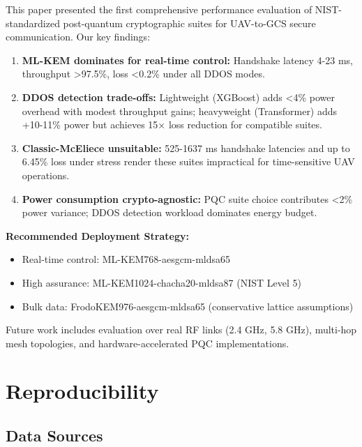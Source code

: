 \documentclass[11pt,a4paper]{article}
\begin{document}
This paper presented the first comprehensive performance evaluation of NIST-standardized post-quantum cryptographic suites for UAV-to-GCS secure communication. Our key findings:

\begin{enumerate}
    \item \textbf{ML-KEM dominates for real-time control:} Handshake latency 4-23 ms, throughput >97.5\%, loss <0.2\% under all DDOS modes.
    \item \textbf{DDOS detection trade-offs:} Lightweight (XGBoost) adds <4\% power overhead with modest throughput gains; heavyweight (Transformer) adds +10-11\% power but achieves 15× loss reduction for compatible suites.
    \item \textbf{Classic-McEliece unsuitable:} 525-1637 ms handshake latencies and up to 6.45\% loss under stress render these suites impractical for time-sensitive UAV operations.
    \item \textbf{Power consumption crypto-agnostic:} PQC suite choice contributes <2\% power variance; DDOS detection workload dominates energy budget.
\end{enumerate}

\textbf{Recommended Deployment Strategy:}
\begin{itemize}
    \item Real-time control: ML-KEM768-aesgcm-mldsa65
    \item High assurance: ML-KEM1024-chacha20-mldsa87 (NIST Level 5)
    \item Bulk data: FrodoKEM976-aesgcm-mldsa65 (conservative lattice assumptions)
\end{itemize}

Future work includes evaluation over real RF links (2.4 GHz, 5.8 GHz), multi-hop mesh topologies, and hardware-accelerated PQC implementations.

\appendix

\section{Reproducibility}
\label{appendix:reproducibility}

\subsection{Data Sources}
\end{document}
